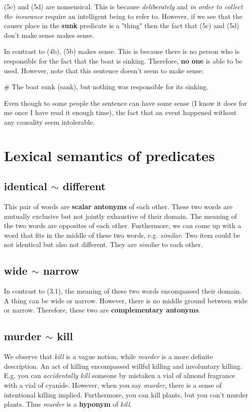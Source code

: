 \documentclass{article}
\begin{document}
(5c) and (5d) are nonsensical. This is because \textit{deliberately} and \textit{in order to collect the insurance} require an intelligent being to refer to. However, if we see that the causer place in the \textbf{sunk} predicate is a "thing" then the fact that (5c) and (5d) don't make sense makes sense. 

In contrast to (4b), (5b) makes sense. This is because there is no person who is responsible for the fact that the boat is sinking. Therefore, \textbf{no one} is able to be used. However, note that this sentence doesn't seem to make sense: 

\# The boat sunk (sank), but nothing was responsible for its sinking. 

Even though to some people the sentence can have some sense (I know it does for me once I have read it enough time), the fact that an event happened without any causality seem intolerable.

\section{Lexical semantics of predicates}
\subsection{identical $\sim$ different}
This pair of words are \textbf{scalar antonyms} of each other. These two words are mutually exclusive but not jointly exhaustive of their domain. The meaning of the two words are opposites of each other. Furthermore, we can come up with a word that fits in the middle of these two words, e.g. \textit{similar}. Two item could be not identical but also not different. They are \textit{similar} to each other. 

\subsection{wide $\sim$ narrow}
In contrast to (3.1), the meaning of these two words encompassed their domain. A thing can be wide or narrow. However, there is no middle ground between wide or narrow. Therefore, these two are \textbf{complementary antonyms}.

\subsection{murder $\sim$ kill}
We observe that \textit{kill} is a vague notion, while \textit{murder} is a more definite description. An act of killing encompassed willful killing and involuntary killing. E.g. you can \textit{accidentally kill} someone by mistaken a vial of almond fragrance with a vial of cyanide. However, when you say \textit{murder}, there is a sense of intentional killing implied. Furthermore, you can kill plants, but you can't murder plants. Thus \textit{murder} is a \textbf{hyponym} of \textit{kill}.
\end{document}
